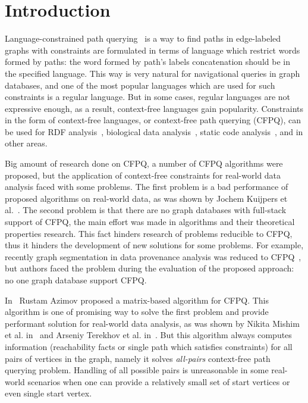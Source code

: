 \section{Introduction}

Language-constrained path querying~\cite{doi:10.1137/S0097539798337716} is a way to find paths in edge-labeled graphs with constraints are formulated in terms of language which restrict words formed by paths: the word formed by path's labels concatenation should be in the specified language.
This way is very natural for navigational queries in graph databases, and one of the most popular languages which are used for such constraints is a regular language. 
But in some cases, regular languages are not expressive enough, as a result, context-free languages gain popularity.
Constraints in the form of context-free languages, or context-free path querying (CFPQ), can be used for RDF analysis~\cite{10.1007/978-3-319-46523-4_38}, biological data analysis~\cite{SubgraphQueriesbyContextfreeGrammars}, static code analysis~\cite{Zheng,10.1145/373243.360208}, and in other areas.

Big amount of research done on CFPQ, a number of CFPQ algorithms were proposed, but the application of context-free constraints for real-world data analysis faced with some problems.
The first problem is a bad performance of proposed algorithms on real-world data, as was shown by Jochem Kuijpers et al.~\cite{Kuijpers:2019:ESC:3335783.3335791}.
The second problem is that there are no graph databases with full-stack support of CFPQ, the main effort was made in algorithms and their theoretical properties research.
This fact hinders research of problems reducible to CFPQ, thus it hinders the development of new solutions for some problems.
For example, recently graph segmentation in data provenance analysis was reduced to CFPQ~\cite{8731467}, but authors faced the problem during the evaluation of the proposed approach: no one graph database support CFPQ.

In~\cite{Azimov:2018:CPQ:3210259.3210264} Rustam Azimov proposed a matrix-based algorithm for CFPQ.
This algorithm is one of promising way to solve the first problem and provide performant solution for real-world data analysis, as was shown by Nikita Mishim et al. in~\cite{Mishin:2019:ECP:3327964.3328503} and Arseniy Terekhov et al. in~\cite{10.1145/3398682.3399163}. 
But this algorithm always computes information (reachability facts or single path which satisfies constraints) for all pairs of vertices in the graph, namely it solves \textit{all-pairs} context-free path querying problem.
Handling of all possible pairs is unreasonable in some real-world scenarios when one can provide a relatively small set of start vertices or even single start vertex. 

